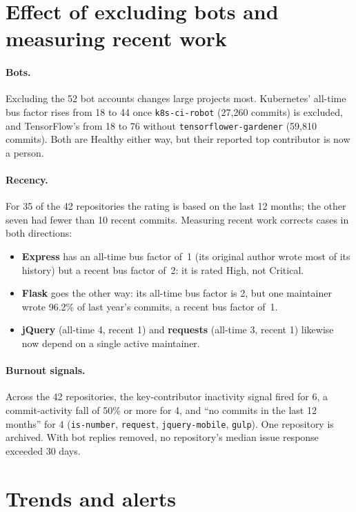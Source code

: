 \documentclass[11pt,a4paper]{report}
\begin{document}
\section{Effect of excluding bots and measuring recent work}

\paragraph{Bots.} Excluding the 52 bot accounts changes large projects most.
Kubernetes' all-time bus factor rises from 18 to 44 once
\nolinkurl{k8s-ci-robot} (27,260 commits) is excluded, and TensorFlow's from 18
to 76 without \nolinkurl{tensorflower-gardener} (59,810 commits). Both are
Healthy either way, but their reported top contributor is now a person.

\paragraph{Recency.} For 35 of the 42 repositories the rating is based on the
last 12 months; the other seven had fewer than 10 recent commits. Measuring
recent work corrects cases in both directions:

\begin{itemize}
  \item \textbf{Express} has an all-time bus factor of~1 (its original author
        wrote most of its history) but a recent bus factor of~2: it is rated
        High, not Critical.
  \item \textbf{Flask} goes the other way: its all-time bus factor is 2, but one
        maintainer wrote 96.2\% of last year's commits, a recent bus factor of~1.
  \item \textbf{jQuery} (all-time 4, recent 1) and \textbf{requests} (all-time
        3, recent 1) likewise now depend on a single active maintainer.
\end{itemize}

\paragraph{Burnout signals.} Across the 42 repositories, the key-contributor
inactivity signal fired for 6, a commit-activity fall of 50\% or more for 4,
and ``no commits in the last 12 months'' for 4 (\texttt{is-number},
\texttt{request}, \texttt{jquery-mobile}, \texttt{gulp}). One repository is
archived. With bot replies removed, no repository's median issue response
exceeded 30 days.

\section{Trends and alerts}
\end{document}
